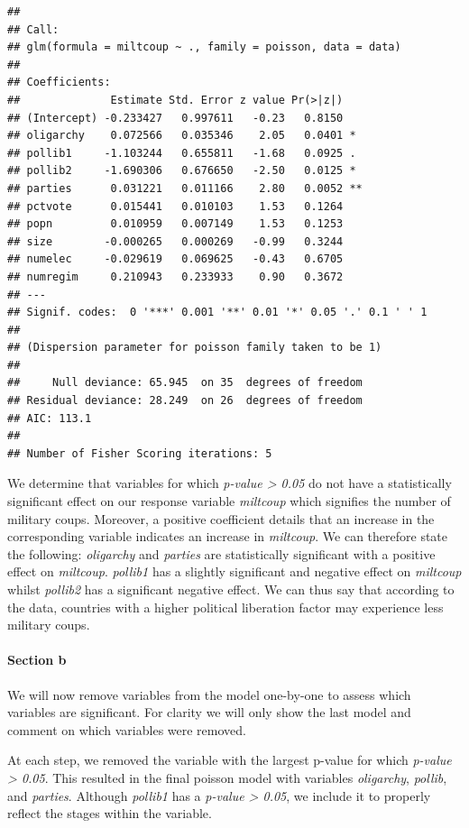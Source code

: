 \documentclass[
  11pt,
]{article}
\begin{document}
\begin{verbatim}
## 
## Call:
## glm(formula = miltcoup ~ ., family = poisson, data = data)
## 
## Coefficients:
##              Estimate Std. Error z value Pr(>|z|)   
## (Intercept) -0.233427   0.997611   -0.23   0.8150   
## oligarchy    0.072566   0.035346    2.05   0.0401 * 
## pollib1     -1.103244   0.655811   -1.68   0.0925 . 
## pollib2     -1.690306   0.676650   -2.50   0.0125 * 
## parties      0.031221   0.011166    2.80   0.0052 **
## pctvote      0.015441   0.010103    1.53   0.1264   
## popn         0.010959   0.007149    1.53   0.1253   
## size        -0.000265   0.000269   -0.99   0.3244   
## numelec     -0.029619   0.069625   -0.43   0.6705   
## numregim     0.210943   0.233933    0.90   0.3672   
## ---
## Signif. codes:  0 '***' 0.001 '**' 0.01 '*' 0.05 '.' 0.1 ' ' 1
## 
## (Dispersion parameter for poisson family taken to be 1)
## 
##     Null deviance: 65.945  on 35  degrees of freedom
## Residual deviance: 28.249  on 26  degrees of freedom
## AIC: 113.1
## 
## Number of Fisher Scoring iterations: 5
\end{verbatim}

We determine that variables for which \emph{p-value \textgreater{} 0.05}
do not have a statistically significant effect on our response variable
\emph{miltcoup} which signifies the number of military coups. Moreover,
a positive coefficient details that an increase in the corresponding
variable indicates an increase in \emph{miltcoup}. We can therefore
state the following: \emph{oligarchy} and \emph{parties} are
statistically significant with a positive effect on \emph{miltcoup}.
\emph{pollib1} has a slightly significant and negative effect on
\emph{miltcoup} whilst \emph{pollib2} has a significant negative effect.
We can thus say that according to the data, countries with a higher
political liberation factor may experience less military coups.

\paragraph{Section b}\label{section-b-1}

We will now remove variables from the model one-by-one to assess which
variables are significant. For clarity we will only show the last model
and comment on which variables were removed.

At each step, we removed the variable with the largest p-value for which
\emph{p-value \textgreater{} 0.05}. This resulted in the final poisson
model with variables \emph{oligarchy}, \emph{pollib}, and
\emph{parties}. Although \emph{pollib1} has a \emph{p-value
\textgreater{} 0.05}, we include it to properly reflect the stages
within the variable.
\end{document}
